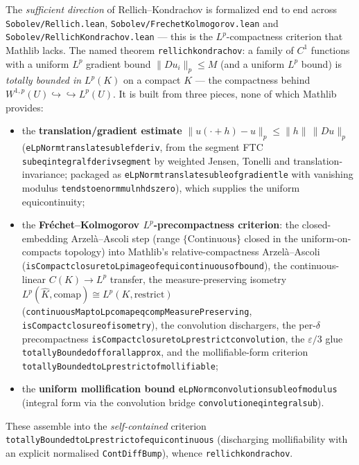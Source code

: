 ﻿\documentclass[12pt, a4paper]{article}
\renewcommand{\_}{\origunderscore\allowbreak}
\theoremstyle{definition}
\theoremstyle{plain}
\begin{document}
The \emph{sufficient direction} of Rellich--Kondrachov is formalized end to end across
\texttt{Sobolev/\allowbreak Rellich.\allowbreak lean}, \texttt{Sobolev/\allowbreak FrechetKolmogorov.\allowbreak lean} and
\texttt{Sobolev/\allowbreak RellichKondrachov.\allowbreak lean} --- this is the $L^p$-compactness criterion that Mathlib
lacks.  The named theorem \texttt{rellich\_kondrachov}: a family of $C^1$ functions with a uniform
$L^p$ gradient bound $\|Du_i\|_p\le M$ (and a uniform $L^p$ bound) is \emph{totally bounded in}
$L^p(K)$ on a compact $K$ --- the compactness behind
$W^{1,p}(U)\hookrightarrow\hookrightarrow L^p(U)$.  It is built from three pieces, none of which
Mathlib provides:
\begin{itemize}
  \item the \textbf{translation/gradient estimate} $\|u(\cdot+h)-u\|_p\le\|h\|\,\|Du\|_p$
    (\texttt{eLpNorm\_translate\_sub\_le\_fderiv}, from the segment FTC
    \texttt{sub\_eq\_integral\_fderiv\_segment} by weighted Jensen, Tonelli and
    translation-invariance; packaged as \texttt{eLpNorm\_translate\_sub\_le\_of\_gradient\_le} with
    vanishing modulus \texttt{tendsto\_enorm\_mul\_nhds\_zero}), which supplies the uniform
    equicontinuity;
  \item the \textbf{Fréchet--Kolmogorov $L^p$-precompactness criterion}: the closed-embedding
    Arzelà--Ascoli step (range $\{\text{Continuous}\}$ closed in the uniform-on-compacts topology)
    into Mathlib's relative-compactness Arzelà--Ascoli
    (\texttt{isCompact\_closure\_toLp\_image\_of\_equicontinuous\_of\_bound}), the continuous-linear
    $C(K)\to L^p$ transfer, the measure-preserving isometry
    $L^p(\hat K,\mathrm{comap})\cong L^p(K,\mathrm{restrict})$
    (\texttt{continuousMap\_toLp\_comap\_eq\_compMeasurePreserving},
    \texttt{isCompact\_closure\_of\_isometry}), the convolution dischargers, the per-$\delta$
    precompactness \texttt{isCompact\_closure\_toLp\_restrict\_convolution}, the $\varepsilon/3$ glue
    \texttt{totallyBounded\_of\_forall\_approx}, and the mollifiable-form criterion
    \texttt{totallyBounded\_toLp\_restrict\_of\_mollifiable};
  \item the \textbf{uniform mollification bound}
    \texttt{eLpNorm\_convolution\_sub\_le\_of\_modulus} (integral form via the convolution bridge
    \texttt{convolution\_eq\_integral\_sub}).
\end{itemize}
These assemble into the \emph{self-contained} criterion
\texttt{totallyBounded\_toLp\_restrict\_of\_equicontinuous} (discharging mollifiability with an
explicit normalised \texttt{ContDiffBump}), whence \texttt{rellich\_kondrachov}.
\end{document}

